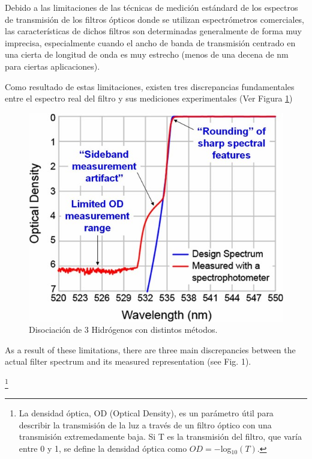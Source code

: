 \documentclass{ctuthesis}
\begin{document}
\hspace{0.5cm}Debido a las limitaciones de las técnicas de medición estándard 
de los espectros de transmisión de los filtros ópticos donde se utilizan 
espectrómetros comerciales, las características de dichos 
filtros son determinadas generalmente de forma muy imprecisa, especialmente 
cuando el ancho de banda de transmisión centrado en una cierta de longitud de 
onda es muy estrecho (menos de una decena de nm para ciertas aplicaciones).


Como resultado de estas limitaciones, existen tres discrepancias fundamentales 
entre el espectro real del filtro y sus mediciones experimentales (Ver Figura 
\ref{fig:obj1a})

\begin{figure}[h!]
	\centering
	\includegraphics[scale=0.5]{Figs/plan_de_tesis/measurement_of_optical_filter.jpg}
	\caption{Disociación de 3 Hidrógenos con distintos métodos.}
	\label{fig:obj1a}
\end{figure} 
As a result of these limitations, there are three main discrepancies between 
the actual filter spectrum and its measured representation (see Fig. 1).

\footnote{La densidad óptica, OD (Optical Density), es un parámetro útil para 
describir 
la transmisión de la luz a través de un filtro óptico con una transmisión 
extremedamente baja. Si T es la transmisión del filtro, que varía entre 0 y 1, 
se define la densidad óptica como $OD = -$log$_{10} (T)$.}
\end{document}
